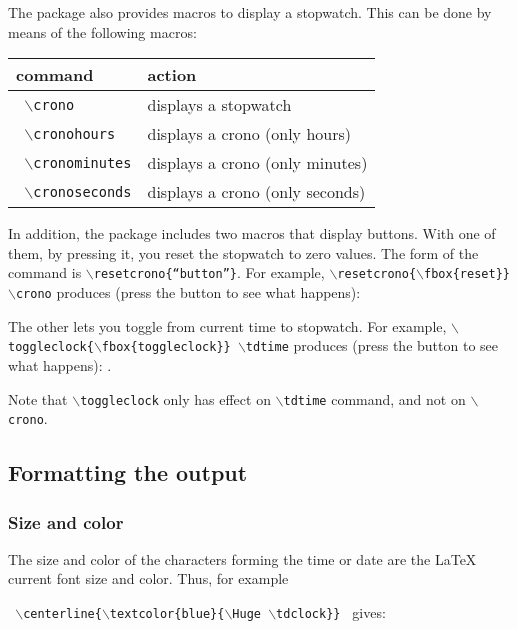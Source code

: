 \documentclass{article}
\begin{document}
The package also provides macros to display a stopwatch.  This can be done
by means of the following macros:

\begin{center}
\begin{tabular}{|l|l|}
\hline
\bf command  & \bf action \\
\hline
\texttt{ $\backslash$crono}              & displays a stopwatch       \\ \hline
\texttt{ $\backslash$cronohours}         & displays a crono (only hours)   \\\hline
\texttt{ $\backslash$cronominutes}       & displays a crono (only minutes) \\\hline
\texttt{ $\backslash$cronoseconds}       & displays a crono (only seconds) \\\hline
\end{tabular}
\end{center}

In addition, the package includes two macros that display buttons. With one of them, by pressing it,
you reset the stopwatch to zero values.  The form of the command is \texttt{$\backslash$resetcrono\{``button''\}}.
For example, \texttt{$\backslash$resetcrono\{$\backslash$fbox\{reset\}\} $\backslash$crono} produces (press the button to see what happens):
 \crono

The other lets you  toggle from current time to stopwatch.  For example,
\texttt{$\backslash$toggleclock\{$\backslash$fbox\{toggleclock\}\} $\backslash$tdtime} produces (press the button to see what happens):
 \tdtime.

Note that \texttt{$\backslash$toggleclock} only has effect on \texttt{$\backslash$tdtime} command, and not on \texttt{$\backslash$crono}.

\subsection{Formatting the output}

\subsubsection{Size and color}
The size and color of the characters forming the time or date are the \LaTeX\/
current font size and color.  Thus, for example

\noindent\texttt{
$\backslash$centerline\{$\backslash$textcolor\{blue\}\{$\backslash$Huge $\backslash$tdclock\}\}
} gives:
\end{document}
